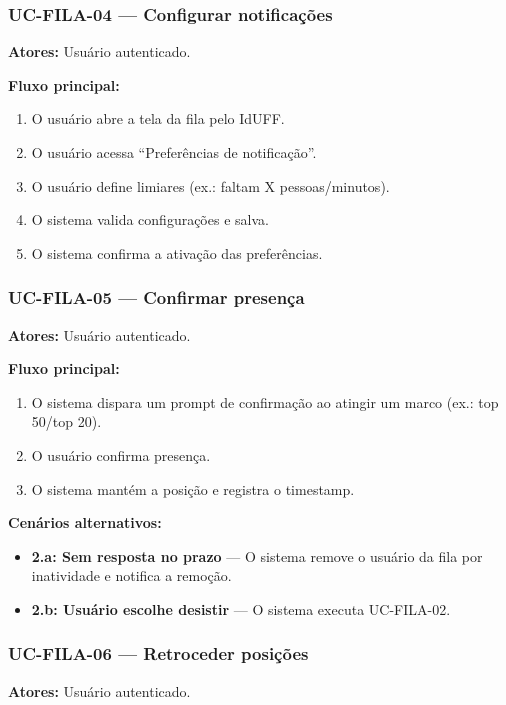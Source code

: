 \documentclass[12pt,a4paper]{article}
\begin{document}
\subsubsection{UC-FILA-04 — Configurar notificações}
\textbf{Atores:} Usuário autenticado.  

\textbf{Fluxo principal:}
\begin{enumerate}
    \item O usuário abre a tela da fila pelo IdUFF.
    \item O usuário acessa “Preferências de notificação”.
    \item O usuário define limiares (ex.: faltam X pessoas/minutos).
    \item O sistema valida configurações e salva.
    \item O sistema confirma a ativação das preferências.
\end{enumerate}

\subsubsection{UC-FILA-05 — Confirmar presença}
\textbf{Atores:} Usuário autenticado.  

\textbf{Fluxo principal:}
\begin{enumerate}
    \item O sistema dispara um prompt de confirmação ao atingir um marco (ex.: top 50/top 20).
    \item O usuário confirma presença.
    \item O sistema mantém a posição e registra o timestamp.
\end{enumerate}

\textbf{Cenários alternativos:}
\begin{itemize}
    \item \textbf{2.a: Sem resposta no prazo} — O sistema remove o usuário da fila por inatividade e notifica a remoção.
    \item \textbf{2.b: Usuário escolhe desistir} — O sistema executa UC-FILA-02.
\end{itemize}

\subsubsection{UC-FILA-06 — Retroceder posições}
\textbf{Atores:} Usuário autenticado.  
\end{document}

